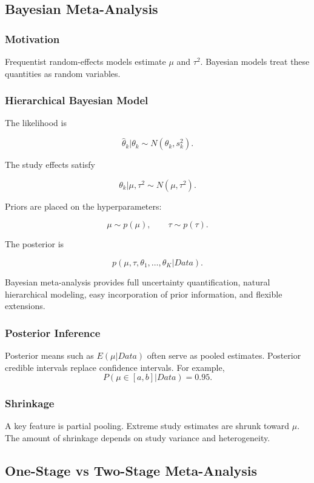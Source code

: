 \documentclass[11pt]{article}
\begin{document}
\subsection*{Bayesian Meta-Analysis}

\subsubsection*{Motivation}

Frequentist random-effects models estimate $\mu$ and $\tau^2$. Bayesian models treat these quantities as random variables.

\subsubsection*{Hierarchical Bayesian Model}

The likelihood is

\[\hat{\theta}_k|\theta_k\sim N(\theta_k,s_k^2).\]

The study effects satisfy

\[\theta_k|\mu,\tau^2\sim N(\mu,\tau^2).\]

Priors are placed on the hyperparameters:

\[\mu\sim p(\mu),\qquad \tau\sim p(\tau).\]

The posterior is

\[p(\mu,\tau,\theta_1,\ldots,\theta_K|Data).\]

Bayesian meta-analysis provides full uncertainty quantification, natural hierarchical modeling, easy incorporation of prior information, and flexible extensions.

\subsubsection*{Posterior Inference}

Posterior means such as $E(\mu|Data)$ often serve as pooled estimates.
Posterior credible intervals replace confidence intervals. For example,
\[P(\mu\in[a,b]|Data)=0.95.\]

\subsubsection*{Shrinkage}

A key feature is partial pooling. Extreme study estimates are shrunk toward $\mu$.
The amount of shrinkage depends on study variance and heterogeneity.

\subsection*{One-Stage vs Two-Stage Meta-Analysis}
\end{document}

